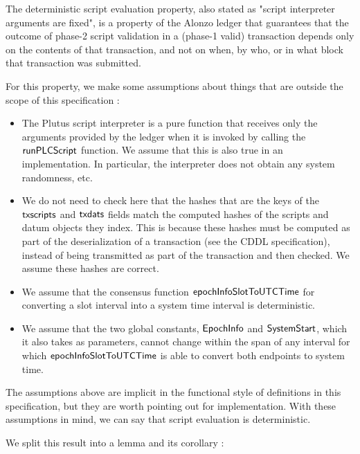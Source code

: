 \begin{property}
  \label{prop:fixed-inputs}

The deterministic script evaluation property, also stated as
"script interpreter arguments are fixed", is a property of the Alonzo ledger
that guarantees that the outcome of phase-2 script validation in a (phase-1 valid) transaction
depends only on the contents of that transaction, and not on when, by who, or in what
block that transaction was submitted.

For this property, we make some assumptions about things that are outside the scope of this specification :

\begin{itemize}
  \item The Plutus script
  interpreter is a pure function that receives only the arguments provided by the ledger when it is
  invoked by calling the $\mathsf{runPLCScript}$ function. We assume that this is
  also true in an implementation. In particular, the interpreter does not
  obtain any system randomness, etc.

  \item We do not need to check here that the hashes that are the keys of the
  $\mathsf{txscripts}$ and $\mathsf{txdats}$ fields match the computed hashes of the scripts and
  datum objects they index. This is because these hashes must be computed as part of
  the deserialization of a transaction (see the CDDL specification),
  instead of being transmitted as part of the transaction and then checked. We
  assume these hashes are correct.

  \item We assume that the consensus
  function $\mathsf{epochInfoSlotToUTCTime}$ for converting a slot interval into a
  system time interval is deterministic.

  \item We assume that the two global
  constants, $\mathsf{EpochInfo}$ and $\mathsf{SystemStart}$, which it also takes as parameters,
  cannot change within the span of any interval for which $\mathsf{epochInfoSlotToUTCTime}$
  is able to convert both endpoints to system time.
\end{itemize}

The assumptions above are implicit in the functional style of definitions in this
specification, but they are worth pointing out for implementation.
With these assumptions in mind, we can say that
script evaluation is deterministic.

We split this result into a lemma and its corollary :


\end{property}
